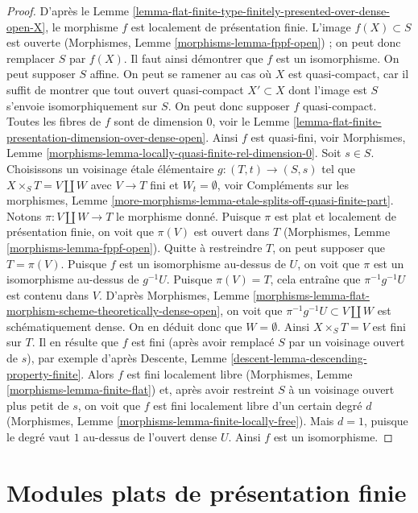 \begin{proof}
D'après le Lemme \ref{lemma-flat-finite-type-finitely-presented-over-dense-open-X},
le morphisme $f$ est localement de présentation finie.
L'image $f(X) \subset S$ est ouverte
(Morphismes, Lemme \ref{morphisms-lemma-fppf-open}) ;
on peut donc remplacer $S$ par $f(X)$. Il faut ainsi démontrer que
$f$ est un isomorphisme. On peut supposer $S$ affine. On peut se ramener
au cas où $X$ est quasi-compact, car il suffit de montrer
que tout ouvert quasi-compact $X' \subset X$ dont l'image est $S$
s'envoie isomorphiquement sur $S$. On peut donc supposer $f$ quasi-compact.
Toutes les fibres de $f$ sont de dimension $0$, voir
le Lemme \ref{lemma-flat-finite-presentation-dimension-over-dense-open}.
Ainsi $f$ est quasi-fini, voir
Morphismes, Lemme \ref{morphisms-lemma-locally-quasi-finite-rel-dimension-0}.
Soit $s \in S$. Choisissons un voisinage \'etale
élémentaire $g : (T, t) \to (S, s)$ tel que $X \times_S T = V \amalg W$
avec $V \to T$ fini et $W_t = \emptyset$, voir
Compléments sur les morphismes, Lemme
\ref{more-morphisms-lemma-etale-splits-off-quasi-finite-part}.
Notons $\pi : V \amalg W \to T$ le morphisme donné. Puisque $\pi$ est
plat et localement de présentation finie, on voit que $\pi(V)$ est
ouvert dans $T$ (Morphismes, Lemme \ref{morphisms-lemma-fppf-open}).
Quitte à restreindre $T$, on peut supposer que $T = \pi(V)$.
Puisque $f$ est un isomorphisme au-dessus de $U$, on voit que $\pi$ est un
isomorphisme au-dessus de $g^{-1}U$. Puisque $\pi(V) = T$, cela entraîne
que $\pi^{-1}g^{-1}U$ est contenu dans $V$.
D'après Morphismes, Lemme
\ref{morphisms-lemma-flat-morphism-scheme-theoretically-dense-open},
on voit que $\pi^{-1}g^{-1}U \subset V \amalg W$ est schématiquement
dense. On en déduit donc que $W = \emptyset$.
Ainsi $X \times_S T = V$ est fini sur $T$.
Il en résulte que $f$ est fini (après avoir remplacé $S$ par un
voisinage ouvert de $s$), par exemple d'après
Descente, Lemme \ref{descent-lemma-descending-property-finite}.
Alors $f$ est fini localement libre
(Morphismes, Lemme \ref{morphisms-lemma-finite-flat})
et, après avoir restreint $S$ à un voisinage ouvert plus petit de $s$,
on voit que $f$ est fini localement libre d'un certain degré $d$
(Morphismes, Lemme \ref{morphisms-lemma-finite-locally-free}).
Mais $d = 1$, puisque le degré vaut $1$ au-dessus
de l'ouvert dense $U$. Ainsi $f$ est un isomorphisme.
\end{proof}





\section{Modules plats de présentation finie}
\label{section-finitely-presented-flat}

